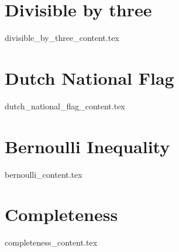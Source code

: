 \documentclass[justified, openany]{tufte-book}
\theoremstyle{plain}%
\theoremstyle{definition}
\theoremstyle{remark}
\begin{document}
\clearpage
\chapter{Divisible by three}
{divisible_by_three_content.tex}

\clearpage
\chapter{Dutch National Flag}
{dutch_national_flag_content.tex}

\clearpage
\chapter{Bernoulli Inequality}
{bernoulli_content.tex}

\clearpage
\chapter{Completeness}
{completeness_content.tex}

\begin{fullwidth}


\end{fullwidth}

\printindex

\listoftodos
\end{document}
